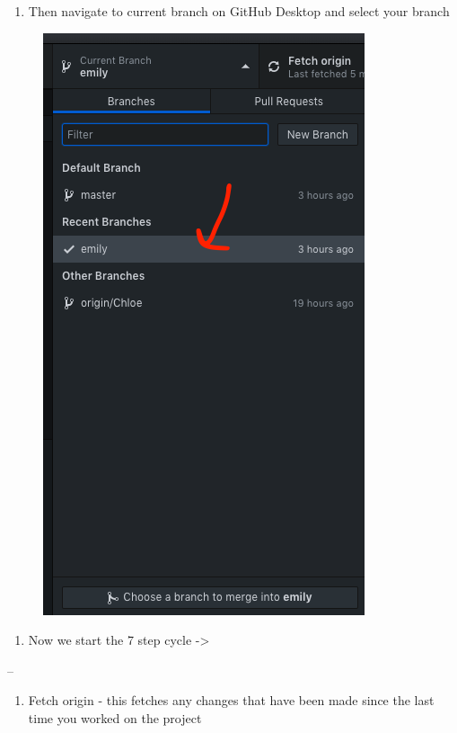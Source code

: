 \documentclass[]{book}
\providecommand{\tightlist}{%
  \setlength{\itemsep}{0pt}\setlength{\parskip}{0pt}}
\begin{document}
\begin{enumerate}
\def\labelenumi{\arabic{enumi}.}
\setcounter{enumi}{2}
\tightlist
\item
  Then navigate to current branch on GitHub Desktop and select your branch
\end{enumerate}

\begin{figure}
\centering
\includegraphics{images/research_protocols/github/23.png}
\caption{}
\end{figure}

\begin{enumerate}
\def\labelenumi{\arabic{enumi}.}
\setcounter{enumi}{3}
\tightlist
\item
  Now we start the 7 step cycle -\textgreater{}
\end{enumerate}

--

\begin{enumerate}
\def\labelenumi{\arabic{enumi}.}
\tightlist
\item
  Fetch origin - this fetches any changes that have been made since the last time you worked on the project
\end{enumerate}
\end{document}
